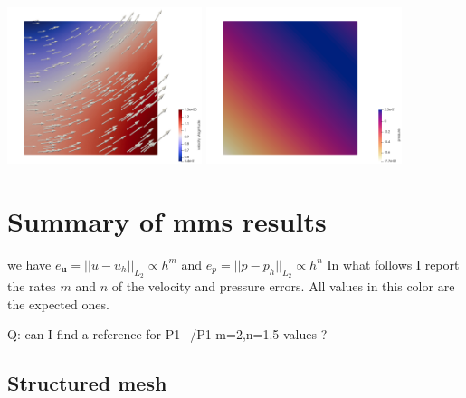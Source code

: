 \begin{center}
\includegraphics[width=5.7cm]{python_codes/fieldstone_120/paperresults/lire19/vel}
\includegraphics[width=5.7cm]{python_codes/fieldstone_120/paperresults/lire19/press}
\end{center}





















\newpage
\section*{Summary of mms results}


we have $e_{\bm u}=||u-u_h||_{L_2} \propto h^m$ and $e_p=||p-p_h||_{L_2} \propto h^n$
In what follows I report the rates $m$ and $n$ of the velocity and pressure errors.
All values in {\color{teal} this color} are the expected ones.

Q: can I find a reference for P1+/P1 m=2,n=1.5 values ?

\subsection*{Structured mesh}

